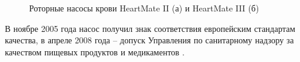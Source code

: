 \begin{figure}[ht]
  \begin{minipage}[ht]{0.48\linewidth}
  \end{minipage}
  \hfill
  \begin{minipage}[ht]{0.48\linewidth}
  \end{minipage}
  \caption{Роторные насосы крови HeartMate II (а) \cite{Griffith_2001} и HeartMate III (б) \cite{molina2013current}}
  \label{img:heartmate_pumps}  
\end{figure}

В ноябре 2005 года насос получил знак соответствия европейским стандартам качества, в апреле 2008 года -- допуск Управления по санитарному надзору за качеством пищевых продуктов и медикаментов \cite{HeartMate_II_Sheikh}. 

